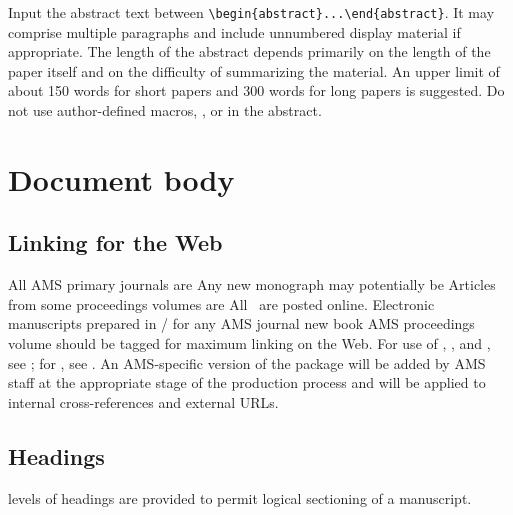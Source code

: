 Input the abstract text between \verb+\begin{abstract}...\end{abstract}+.
It may comprise multiple paragraphs and include unnumbered display
material if appropriate.  The length of the abstract depends primarily
on the length of the 
\ifmemoirs{\Memo}
\else paper
\fi
itself and on the difficulty of summarizing the material.
An upper limit of about 150 words for short papers and 300 words for
long papers is suggested.  Do not use author-defined
macros, , or  in the abstract.
\fi %


\section{Document body}

\subsection{Linking for the Web}
\jmpm
 {All AMS primary journals are}%
 {Any new monograph may potentially be}%
 {Articles from some proceedings volumes are}%
 {All \Memos\ are} 
posted online.  Electronic manuscripts
prepared in \latex/ for any
\jmpm
 {AMS journal}%
 {new book}%
 {AMS proceedings volume}%
 {\Memo}
should be tagged for maximum
linking on the Web. For use of , , and ,
see \cite{MG}; for , see \cite{AMG}.  An AMS-specific version
of the  package will be added by AMS staff at the
appropriate stage of the production process and will be applied to internal
cross-references and external URLs.

\subsection{Headings}
levels of headings are provided to permit logical sectioning of
a manuscript.

